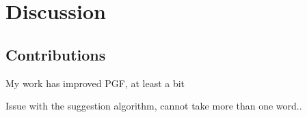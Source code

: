\chapter{Discussion}\label{ch:discussion}

\section{Contributions}
My work has improved PGF, at least a bit


Issue with the suggestion algorithm, cannot take more than one word..